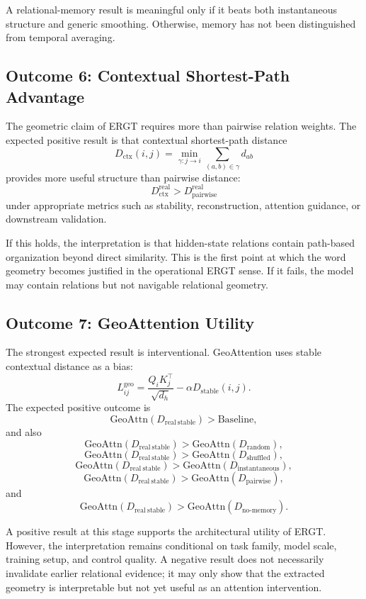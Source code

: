 \documentclass[11pt]{article}
\begin{document}
\begin{ergtclaim}
A relational-memory result is meaningful only if it beats both instantaneous structure and generic smoothing. Otherwise, memory has not been distinguished from temporal averaging.
\end{ergtclaim}

\subsection{Outcome 6: Contextual Shortest-Path Advantage}

The geometric claim of ERGT requires more than pairwise relation weights. The expected positive result is that contextual shortest-path distance
\[
D_{\mathrm{ctx}}(i,j)
=
\min_{\gamma:j\to i}
\sum_{(a,b)\in\gamma}d_{ab}
\]
provides more useful structure than pairwise distance:
\[
D_{\mathrm{ctx}}^{\mathrm{real}}
>
D_{\mathrm{pairwise}}^{\mathrm{real}}
\]
under appropriate metrics such as stability, reconstruction, attention guidance, or downstream validation.

If this holds, the interpretation is that hidden-state relations contain path-based organization beyond direct similarity. This is the first point at which the word geometry becomes justified in the operational ERGT sense. If it fails, the model may contain relations but not navigable relational geometry.

\subsection{Outcome 7: GeoAttention Utility}

The strongest expected result is interventional. GeoAttention uses stable contextual distance as a bias:
\[
L_{ij}^{\mathrm{geo}}
=
\frac{Q_iK_j^\top}{\sqrt{d_h}}
-
\alpha D_{\mathrm{stable}}(i,j).
\]
The expected positive outcome is
\[
\mathrm{GeoAttn}(D_{\mathrm{real\ stable}})>
\mathrm{Baseline},
\]
and also
\[
\mathrm{GeoAttn}(D_{\mathrm{real\ stable}})>
\mathrm{GeoAttn}(D_{\mathrm{random}}),
\]
\[
\mathrm{GeoAttn}(D_{\mathrm{real\ stable}})>
\mathrm{GeoAttn}(D_{\mathrm{shuffled}}),
\]
\[
\mathrm{GeoAttn}(D_{\mathrm{real\ stable}})>
\mathrm{GeoAttn}(D_{\mathrm{instantaneous}}),
\]
\[
\mathrm{GeoAttn}(D_{\mathrm{real\ stable}})>
\mathrm{GeoAttn}(D_{\mathrm{pairwise}}),
\]
and
\[
\mathrm{GeoAttn}(D_{\mathrm{real\ stable}})>
\mathrm{GeoAttn}(D_{\mathrm{no\text{-}memory}}).
\]

A positive result at this stage supports the architectural utility of ERGT. However, the interpretation remains conditional on task family, model scale, training setup, and control quality. A negative result does not necessarily invalidate earlier relational evidence; it may only show that the extracted geometry is interpretable but not yet useful as an attention intervention.
\end{document}
